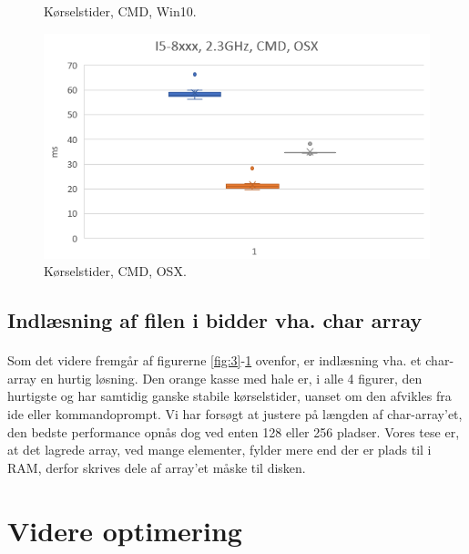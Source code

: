 \documentclass{article}
\begin{document}
\begin{figure}[htb]
\begin{minipage}[t]{.5\textwidth}
            \caption{Kørselstider, CMD, Win10.}\label{fig:5}
        \end{minipage}
        \hfill
        \begin{minipage}[t]{.5\textwidth}
            \centering
            \includegraphics[width=\textwidth]{images/osxcmdkmh.PNG}
            \caption{Kørselstider, CMD, OSX.}\label{fig:6}
        \end{minipage}
    \end{figure}
\subsection{Indlæsning af filen i bidder vha. char array}
\paragraph{}Som det videre fremgår af figurerne \ref*{fig:3}-\ref*{fig:6} ovenfor, er indlæsning vha. et char-array en hurtig løsning. Den orange kasse med hale er, i alle 4 figurer, den hurtigste og har samtidig ganske stabile kørselstider, uanset om den afvikles fra ide eller kommandoprompt.
Vi har forsøgt at justere på længden af char-array'et, den bedste performance opnås dog ved enten 128 eller 256 pladser. Vores tese er, at det lagrede array, ved mange elementer, fylder mere end der er plads til i RAM, derfor skrives dele af array'et måske til disken. 
\newpage
\section{Videre optimering}
\end{document}
